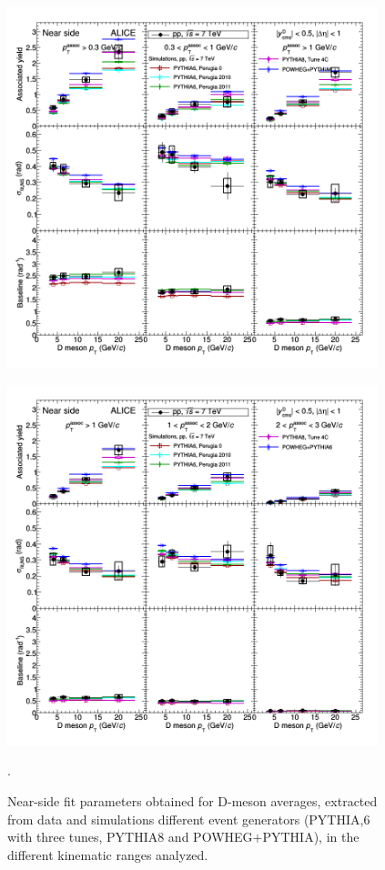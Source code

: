 \begin{figure}[h]
\centering
\includegraphics[width=0.96\textwidth]{figures/CfrPPandModels/ComparePPtoMCFitResults.png}
\end{figure}
\begin{figure}[h]
\centering
\includegraphics[width=0.96\textwidth]{figures/CfrPPandModels/ComparePPtoMCFitResults_2.png}
\caption{Near-side fit parameters obtained for D-meson averages, extracted from data and simulations different event generators (PYTHIA,6 with three tunes, PYTHIA8 and POWHEG$+$PYTHIA), in the different kinematic ranges analyzed.}.
\label{fig:pp-modelsfitns}
\end{figure}


